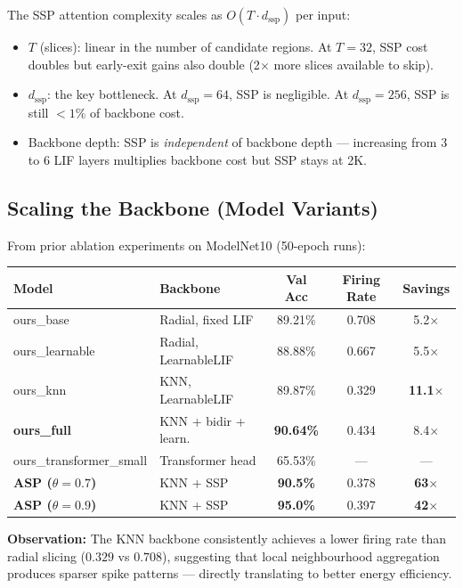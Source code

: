 \documentclass[11pt,a4paper]{article}
\begin{document}
The SSP attention complexity scales as $O(T \cdot d_{\text{ssp}})$ per input:

\begin{itemize}
  \item $T$ (slices): linear in the number of candidate regions. At $T=32$, SSP cost doubles but
        early-exit gains also double (2$\times$ more slices available to skip).
  \item $d_{\text{ssp}}$: the key bottleneck. At $d_{\text{ssp}}=64$, SSP is negligible.
        At $d_{\text{ssp}}=256$, SSP is still $<1\%$ of backbone cost.
  \item Backbone depth: SSP is \emph{independent} of backbone depth --- increasing from 3 to 6
        LIF layers multiplies backbone cost but SSP stays at 2K.
\end{itemize}

\subsection{Scaling the Backbone (Model Variants)}

From prior ablation experiments on ModelNet10 (50-epoch runs):

\begin{center}
\begin{tabular}{llccc}
\toprule
\textbf{Model} & \textbf{Backbone} & \textbf{Val Acc} & \textbf{Firing Rate} & \textbf{Savings} \\
\midrule
ours\_base & Radial, fixed LIF & 89.21\% & 0.708 & 5.2$\times$ \\
ours\_learnable & Radial, LearnableLIF & 88.88\% & 0.667 & 5.5$\times$ \\
ours\_knn & KNN, LearnableLIF & 89.87\% & 0.329 & \textbf{11.1$\times$} \\
\textbf{ours\_full} & KNN + bidir + learn. & \textbf{90.64\%} & 0.434 & 8.4$\times$ \\
ours\_transformer\_small & Transformer head & 65.53\% & --- & --- \\
\midrule
\textbf{ASP ($\theta=0.7$)} & KNN + SSP & \textbf{90.5\%} & 0.378 & \textbf{63$\times$} \\
\textbf{ASP ($\theta=0.9$)} & KNN + SSP & \textbf{95.0\%} & 0.397 & \textbf{42$\times$} \\
\bottomrule
\end{tabular}
\end{center}

\noindent\textbf{Observation:} The KNN backbone consistently achieves a lower firing rate than radial
slicing ($0.329$ vs $0.708$), suggesting that local neighbourhood aggregation produces sparser
spike patterns --- directly translating to better energy efficiency.
\end{document}
